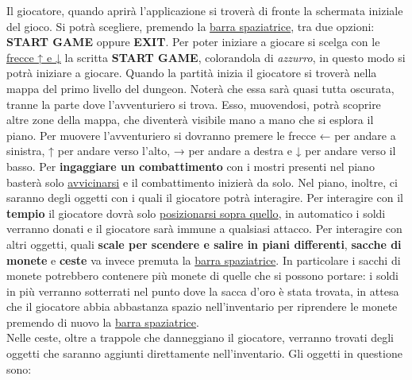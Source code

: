 \documentclass{report}
\begin{document}
Il giocatore, quando aprirà l’applicazione si troverà di fronte la schermata iniziale del gioco. 
%
Si potrà scegliere, premendo la \underline{barra spaziatrice}, tra due opzioni: \textbf{START GAME} oppure \textbf{EXIT}.
%
Per poter iniziare a giocare si scelga con le \underline{frecce ↑ e ↓}  la scritta \textbf{START GAME}, colorandola di \textit{azzurro}, in questo modo si potrà iniziare a giocare.
%
Quando la partità inizia il giocatore si troverà nella mappa del primo livello del dungeon.
%
Noterà che essa sarà quasi tutta oscurata, tranne la parte dove l’avventuriero si trova. 
%
Esso, muovendosi, potrà scoprire altre zone della mappa, che diventerà visibile mano a mano che si esplora il piano.
%
Per muovere l’avventuriero si dovranno premere le frecce ← per andare a sinistra, ↑ per andare verso l’alto, → per andare a destra e ↓ per andare verso il basso.
%
Per \textbf{ingaggiare un combattimento} con i mostri presenti nel piano basterà solo \underline{avvicinarsi} e il combattimento inizierà da solo.
%
Nel piano, inoltre, ci saranno degli oggetti con i quali il giocatore potrà interagire.
%
Per interagire con il \textbf{tempio} il giocatore dovrà solo \underline{posizionarsi sopra quello}, in automatico i soldi verranno donati e il giocatore sarà immune a qualsiasi attacco.
%
Per interagire con altri oggetti, quali \textbf{scale per scendere e salire in piani differenti}, \textbf{sacche di monete} e \textbf{ceste} va invece premuta la \underline{barra spaziatrice}.
%
In particolare i sacchi di monete potrebbero contenere più monete di quelle che si possono portare: i soldi in più verranno sotterrati nel punto dove la sacca d’oro è stata trovata, in attesa che il giocatore abbia abbastanza spazio nell’inventario per riprendere le monete premendo di nuovo la \underline{barra spaziatrice}. 
%
\\
%
Nelle ceste, oltre a trappole che danneggiano il giocatore, verranno trovati degli oggetti che saranno aggiunti direttamente nell’inventario.
%
Gli oggetti in questione sono:
%
\end{document}
